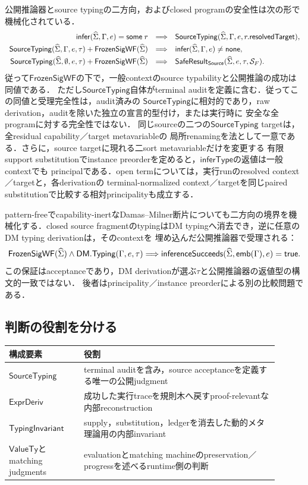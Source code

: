 公開推論器とsource typingの二方向，およびclosed programの安全性は次の形で機械化されている．
\[
\begin{array}{rcl}
\mathsf{infer}(\widehat{\Sigma},\Gamma,e)=\mathsf{some}\;r
&\Longrightarrow&
\mathsf{SourceTyping}(\widehat{\Sigma},\Gamma,e,r.\mathsf{resolvedTarget}),\\[0.3em]
\mathsf{SourceTyping}(\widehat{\Sigma},\Gamma,e,\tau)
+\mathsf{FrozenSigWF}(\widehat{\Sigma})
&\Longrightarrow&
\mathsf{infer}(\widehat{\Sigma},\Gamma,e)\ne\mathsf{none},\\[0.3em]
\mathsf{SourceTyping}(\widehat{\Sigma},\emptyset,e,\tau)
+\mathsf{FrozenSigWF}(\widehat{\Sigma})
&\Longrightarrow&
\mathsf{SafeResult}_{\mathsf{Source}}(\widehat{\Sigma},e,\tau,\mathcal S_F).
\end{array}
\]
従って$\mathsf{FrozenSigWF}$の下で，一般contextのsource typabilityと公開推論の成功は同値である．
ただし$\mathsf{SourceTyping}$自体がterminal auditを定義に含む．従ってこの同値と受理完全性は，audit済みの
$\mathsf{SourceTyping}$に相対的であり，raw derivation，auditを除いた独立の宣言的型付け，または実行時に
安全な全programに対する完全性ではない．
同じsourceの二つの$\mathsf{SourceTyping}$ targetは，全residual capability／target metavariableの
局所renamingを法として一意である．さらに，source targetに現れる二sort metavariableだけを変更する
有限support substitutionでinstance preorderを定めると，$\mathsf{inferType}$の返値は一般contextでも
principalである．open termについては，実行runのresolved context／targetと，各derivationの
terminal-normalized context／targetを同じpaired substitutionで比較する相対principalityも成立する．

pattern-freeでcapability-inertなDamas--Milner断片についても二方向の境界を機械化する．closed
source fragmentのtypingはDM typingへ消去でき，逆に任意のDM typing derivationは，そのcontextを
埋め込んだ公開推論器で受理される：
\[
\mathsf{FrozenSigWF}(\widehat{\Sigma})\land
\mathsf{DM.Typing}(\Gamma,e,\tau)
\Longrightarrow
\mathsf{inferenceSucceeds}(\widehat{\Sigma},\mathsf{emb}(\Gamma),e)=\mathsf{true}.
\]
この保証はacceptanceであり，DM derivationが選ぶ$\tau$と公開推論器の返値型の構文的一致ではない．
後者はprincipality／instance preorderによる別の比較問題である．

\subsection{判断の役割を分ける}

\begin{center}
\begin{tabular}{p{0.25\linewidth}p{0.65\linewidth}}
\toprule
構成要素 & 役割 \\
\midrule
$\mathsf{SourceTyping}$
  & terminal auditを含み，source acceptanceを定義する唯一の公開judgment \\
$\mathsf{ExprDeriv}$
  & 成功した実行traceを規則木へ戻すproof-relevantな内部reconstruction \\
$\mathsf{TypingInvariant}$
  & supply，substitution，ledgerを消去した動的メタ理論用の内部invariant \\
$\mathsf{ValueTy}$とmatching judgments
  & evaluationとmatching machineのpreservation／progressを述べるruntime側の判断 \\
\bottomrule
\end{tabular}
\end{center}

